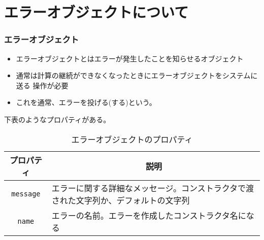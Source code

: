  \section{エラーオブジェクトについて}
\begin{frame}[containsverbatim]
 \frametitle{エラーオブジェクト}
 \begin{itemize}
	\item エラーオブジェクトとはエラーが発生したことを知らせるオブジェクト
	\item 通常は計算の継続ができなくなったときにエラーオブジェクトをシステムに送る
操作が必要
	\item これを通常、エラーを投げる(する)という。
 \end{itemize}
下表のようなプロパティがある。
\begin{table}[ht]
 \caption{エラーオブジェクトのプロパティ}
 \begin{center}
	 \begin{tabular}{|c|m{}|}\hline
		プロパティ&\multicolumn{1}{c|}{説明}\\ \hline
		\texttt{message}&エラーに関する詳細なメッセージ。コンストラクタで渡
				された文字列か、デフォルトの文字列\\ \hline
		\texttt{name}&エラーの名前。エラーを作成したコンストラクタ名になる\\ \hline

	\end{tabular}
 \end{center}
\end{table}
\end{frame}
